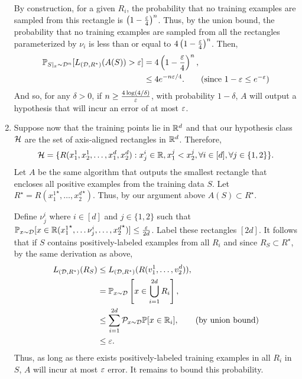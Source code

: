\begin{solution}
\begin{enumerate}[label=(\alph*)]
        By construction, for a given $R_i$, the probability that no training examples are sampled from this rectangle is $\left(1- \frac{\varepsilon}{4}\right)^n$. Thus, by the union bound, the probability that no training examples are sampled from all the rectangles parameterized by $\nu_i$ is less than or equal to $4\left(1 - \frac{\varepsilon}{4}\right)^n$. Then, 
        \begin{align*}
            \P_{S|_x \sim \cD^n}[L_{(\cD, R^\star)}(A(S)) > \eps] &= 4\left(1 - \frac{\eps}{4}\right)^n, \\
            &\leq 4 e^{-n\eps/4}. \tag{since $1-\eps \leq e^{-\eps}$}
        \end{align*}
        And so, for any $\delta > 0$, if $n \geq \frac{4\log(4/\delta)}{\varepsilon}$, with probability $1-\delta$, $A$ will output a hypothesis that will incur an error of at most $\varepsilon$. 

        \item Suppose now that the training points lie in $\mathbb{R}^d$ and that our hypothesis class $\mathcal{H}$ are the set of axis-aligned rectangles in $\mathbb{R}^d$. Therefore, 
        \[
        \mathcal{H} = \{R(x^1_1, x^1_2,\ldots,x^d_1,x^d_2):x^i_j \in \mathbb{R}, x^j_1 < x^j_2, \forall i \in [d], \forall j \in \{1,2\} \}.
        \]
        Let $A$ be the same algorithm that outputs the smallest rectangle that encloses all positive examples from the training data $S$. Let $R^\star = R({x^1_1}^\star, \ldots, {x^d_2}^\star)$. Thus, by our argument above $A(S) \subset R^\star$.
        
        Define $\nu^i_j$ where $i \in [d]$ and $j\in \{1,2\}$ such that $\mathbb{P}_{x \sim \mathcal{D}}[x \in \mathbb{R}({{x^1_1}^\star,\ldots \nu^i_j,\ldots,{x^d_2}^\star})] \leq \frac{\varepsilon}{2d}$. Label these rectangles $[2d]$. It follows that if $S$ contains positively-labeled examples from all $R_i$ and since $R_S \subset R^\star$, by the same derivation as above,
        \begin{align*}
            L_{(\mathcal{D}, R^\star)}(R_S) &\leq L_{(\mathcal{D}, R^\star)}(R(v_1^1,\ldots,v_2^d)), \\
            &= \mathbb{P}_{x\sim \mathcal{D}}\left[x \in \bigcup_{i=1}^{2d} R_i\right], \\
            &\leq \sum_{i=1}^{2d} \mathcal{P}_{x \sim \mathcal{D}} \mathbb{P}[x \in \mathbb{R}_i], \tag{by union bound} \\
            &\leq \varepsilon.
        \end{align*}
        Thus, as long as there exists positively-labeled training examples in all $R_i$ in $S$, $A$ will incur at most $\varepsilon$ error. It remains to bound this probability. 


\end{enumerate}
\end{solution}
